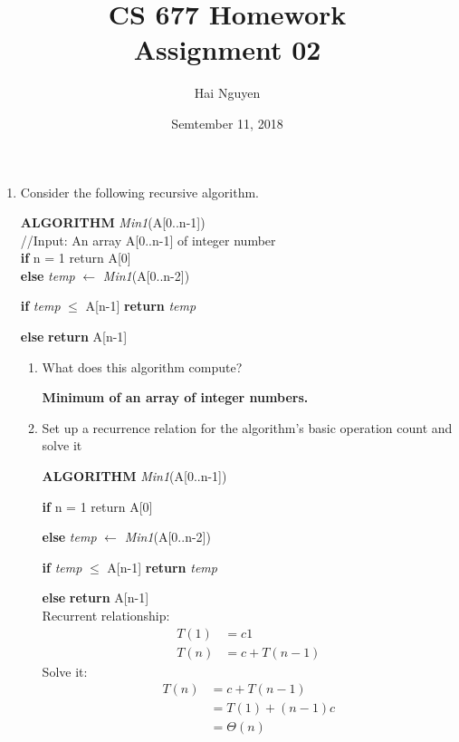 \documentclass[[11pts]{report}
\title{CS 677 Homework \\ Assignment 02}
\date{Semtember 11, 2018}
\author{Hai Nguyen}
\begin{document}
\maketitle

\begin{enumerate}

\item Consider the following recursive algorithm.

\textbf{ALGORITHM} \textit{Min1}(A[0..n-1])
\\//Input: An array A[0..n-1] of integer number
\\\textbf{if} n = 1 return A[0]
\\\textbf{else} \textit{temp} $\gets$ \textit{Min1}(A[0..n-2])
\par \quad \quad \textbf{if} \textit{temp} $\leq$ A[n-1] \textbf{return} \textit{temp}
\par \quad  \quad \textbf{else} \textbf{return} A[n-1]

\begin{enumerate}
\item What does this algorithm compute? 
\begin{center}
\textbf{Minimum of an array of integer numbers.}
\end{center} 

\item Set up a recurrence relation for the algorithm's basic operation count and solve it
\par \textbf{ALGORITHM} \textit{Min1}(A[0..n-1])
\par \textbf{if} n = 1 return A[0]  
\par\textbf{else} \textit{temp} $\gets$ \textit{Min1}(A[0..n-2])  \quad  [c2 + T(n-1)]
\par \quad \quad \textbf{if} \textit{temp} $\leq$ A[n-1] \textbf{return} \textit{temp} 
\par \quad  \quad \textbf{else} \textbf{return} A[n-1] 
\\ Recurrent relationship:
\begin{align*}
T(1) &= c1 \\
T(n) &= c + T(n-1)
\end{align*}
Solve it:
\begin{align*}
T(n) &= c + T(n-1) \\
     &= T(1) + (n-1)c \\
     &= \Theta(n)
\end{align*}
\end{enumerate}


\end{enumerate}
\end{document}
